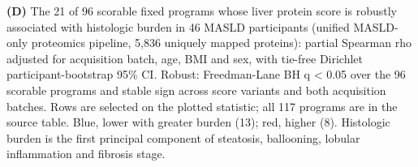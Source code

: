 \textbf{(D)} The 21 of 96 scorable fixed programs whose liver protein score is robustly associated with histologic burden in 46 MASLD participants (unified MASLD-only proteomics pipeline, 5,836 uniquely mapped proteins): partial Spearman rho adjusted for acquisition batch, age, BMI and sex, with tie-free Dirichlet participant-bootstrap 95\% CI. Robust: Freedman-Lane BH q \textless{} 0.05 over the 96 scorable programs and stable sign across score variants and both acquisition batches. Rows are selected on the plotted statistic; all 117 programs are in the source table. Blue, lower with greater burden (13); red, higher (8). Histologic burden is the first principal component of steatosis, ballooning, lobular inflammation and fibrosis stage.
